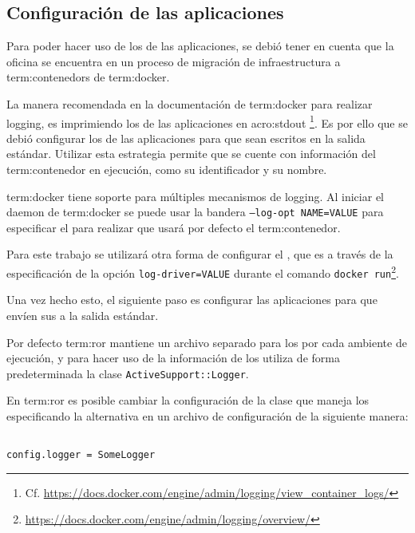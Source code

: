 \subsection{Configuración de las aplicaciones}
\label{configuracion_de_las_aplicaciones}

Para poder hacer uso de los  de las aplicaciones, se debió tener en
cuenta que la oficina se encuentra en un proceso de migración de
infraestructura a \glspl{term:contenedor} de \gls{term:docker}.

La manera recomendada en la documentación de \gls{term:docker} para realizar
logging, es imprimiendo los  de las aplicaciones en \gls{acro:stdout}
\footnote{Cf.
\url{https://docs.docker.com/engine/admin/logging/view_container_logs/}}.  Es
por ello que se debió configurar los  de las aplicaciones para que
sean escritos en la salida estándar. Utilizar esta estrategia permite que se
cuente con información del \gls{term:contenedor} en ejecución, como su
identificador y su nombre.

\gls{term:docker} tiene soporte para múltiples mecanismos de logging. Al
iniciar el daemon de \gls{term:docker} se puede usar la bandera
\texttt{--log-opt NAME=VALUE} para especificar el  para realizar
 que usará por defecto el \gls{term:contenedor}.

Para este trabajo se utilizará otra forma de configurar el , que es
a través de la especificación de la opción \texttt{log-driver=VALUE} durante el
comando \lstinline{docker run}\footnote{
\url{https://docs.docker.com/engine/admin/logging/overview/}}.

Una vez hecho esto, el siguiente paso es configurar las aplicaciones para que
envíen sus  a la salida estándar.

Por defecto \gls{term:ror} mantiene un archivo separado para los  por
cada ambiente de ejecución, y para hacer uso de la información de los 
utiliza de forma predeterminada la clase \texttt{ActiveSupport::Logger}.

En \gls{term:ror} es posible cambiar la configuración de la clase que maneja los
 especificando la alternativa en un archivo de configuración de la
siguiente manera:

\begin{lstlisting}

config.logger = SomeLogger

\end{lstlisting}

